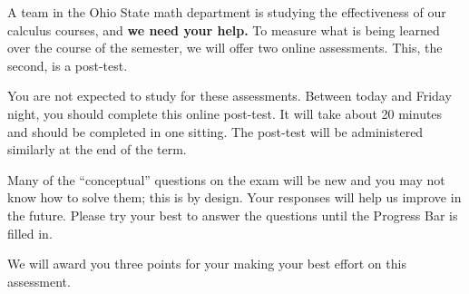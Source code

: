 \documentclass{ximera}
\begin{document}
A team in the Ohio State math department is studying the effectiveness
of our calculus courses, and \textbf{we need your help.}  To measure
what is being learned over the course of the semester, we will offer
two online assessments.  This, the second, is a post-test.

You are not expected to study for these assessments.  Between today
and Friday night, you should complete this online post-test.  It will
take about 20 minutes and should be completed in one sitting.  The
post-test will be administered similarly at the end of the term.

Many of the ``conceptual'' questions on the exam will be new and you
may not know how to solve them; this is by design.  Your responses
will help us improve in the future.  Please try your best to answer
the questions until the Progress Bar is filled in.

We will award you three points for your making your best effort on
this assessment.
\end{document}
